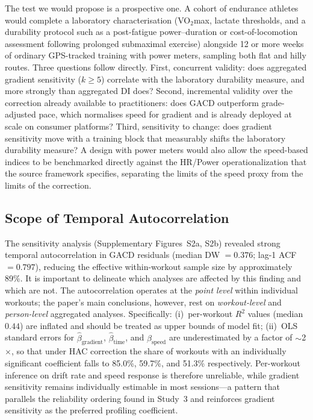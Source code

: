 \documentclass[times, twoside]{zHenriquesLab-StyleBioRxiv}
\begin{document}
The test we would propose is a prospective one. A cohort of endurance athletes would complete a laboratory characterisation (VO$_2$max, lactate thresholds, and a durability protocol such as a post-fatigue power--duration or cost-of-locomotion assessment following prolonged submaximal exercise) alongside 12 or more weeks of ordinary GPS-tracked training with power meters, sampling both flat and hilly routes. Three questions follow directly. First, concurrent validity: does aggregated gradient sensitivity ($k \geq 5$) correlate with the laboratory durability measure, and more strongly than aggregated DI does? Second, incremental validity over the correction already available to practitioners: does GACD outperform grade-adjusted pace, which normalises speed for gradient and is already deployed at scale on consumer platforms? Third, sensitivity to change: does gradient sensitivity move with a training block that measurably shifts the laboratory durability measure? A design with power meters would also allow the speed-based indices to be benchmarked directly against the HR/Power operationalization that the source framework specifies, separating the limits of the speed proxy from the limits of the correction.

\subsection*{Scope of Temporal Autocorrelation}

The sensitivity analysis (Supplementary Figures~S2a, S2b) revealed strong temporal autocorrelation in GACD residuals (median DW $= 0.376$; lag-1 ACF $= 0.797$), reducing the effective within-workout sample size by approximately 89\%. It is important to delineate which analyses are affected by this finding and which are not. The autocorrelation operates at the \textit{point level} within individual workouts; the paper's main conclusions, however, rest on \textit{workout-level} and \textit{person-level} aggregated analyses. Specifically: (i)~per-workout $R^2$ values (median $0.44$) are inflated and should be treated as upper bounds of model fit; (ii)~OLS standard errors for $\hat{\beta}_{\text{gradient}}$, $\hat{\beta}_{\text{time}}$, and $\hat{\beta}_{\text{speed}}$ are underestimated by a factor of $\sim$2$\times$, so that under HAC correction the share of workouts with an individually significant coefficient falls to 85.0\%, 59.7\%, and 51.3\% respectively. Per-workout inference on drift rate and speed response is therefore unreliable, while gradient sensitivity remains individually estimable in most sessions---a pattern that parallels the reliability ordering found in Study~3 and reinforces gradient sensitivity as the preferred profiling coefficient.
\end{document}
